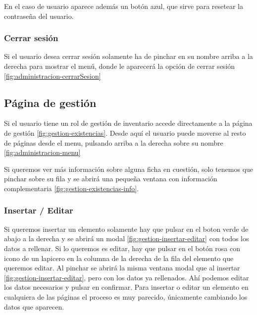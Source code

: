En el caso de usuario aparece además un botón azul, que sirve para resetear la contraseña del usuario.


\subsubsection{Cerrar sesión}

Si el usuario desea cerrar sesión solamente ha de pinchar en su nombre arriba a la derecha para mostrar el menú, donde le aparecerá la opción de cerrar sesión \ref{fig:administracion-cerrarSesion} 


\subsection{Página de gestión}

Si el usuario tiene un rol de gestión de inventario accede directamente a la página de gestión \ref{fig:gestion-existencias}. Desde aquí el usuario puede moverse al resto de páginas desde el menu, pulsando arriba a la derecha sobre su nombre \ref{fig:administracion-menu}


Si queremos ver más información sobre alguna ficha en cuestión, solo tenemos que pinchar sobre su fila y se abrirá una pequeña ventana con información complementaria \ref{fig:gestion-existencias-info}.


\subsubsection{Insertar / Editar}

Si queremos insertar un elemento solamente hay que pulsar en el boton verde de abajo a la derecha y se abrirá un modal \ref{fig:gestion-insertar-editar} con todos los datos a rellenar. Si lo queremos es editar, hay que pulsar en el botón rosa con icono de un lapicero en la columna de la derecha de la fila del elemento que queremos editar. Al pinchar se abrirá la misma ventana modal que al insertar \ref{fig:gestion-insertar-editar}, pero con los datos ya rellenados. Ahí podemos editar los datos necesarios y pulsar en confirmar.  
Para insertar o editar un elemento en cualquiera de las páginas el proceso es muy parecido, únicamente cambiando los datos que aparecen. 

